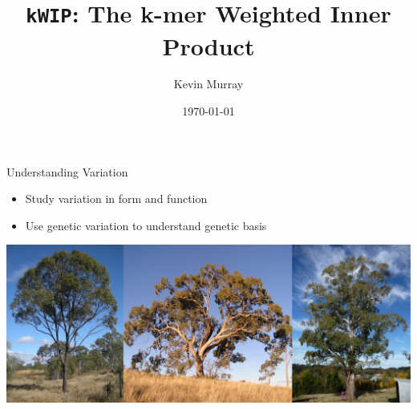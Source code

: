 \documentclass[t]{beamer}
\title{\texttt{kWIP}: The k-mer Weighted Inner Product}
\author{Kevin Murray}
\institute{Borevitz Lab, CPEB, ANU}
\date{\today}
\begin{document}
{
\begin{frame}
  \titlepage
  \vfill
\end{frame}
}

\begin{frame}{Understanding Variation}
  \begin{itemize}
    \item Study variation in form and function
    \item Use genetic variation to understand genetic basis
  \end{itemize}
  \begin{center}
    \includegraphics[width=\textwidth]{img/eucs.png}
  \end{center}
\end{frame}
\end{document}
